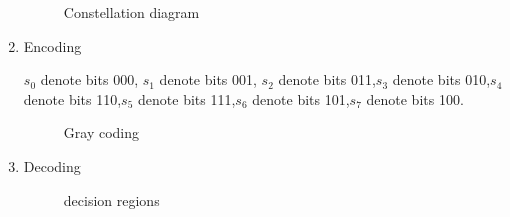 \begin{enumerate}[label=\thesubsection.\arabic*.,ref=\thesubsection.\theenumi]
\begin{figure}[!ht]
                \resizebox{\columnwidth}{!}{}
\label{fig:ee18btech11012_fig1}
\caption{Constellation diagram}
\end{figure}


\item Encoding

$s_0$ denote bits 000, $s_1$ denote bits 001, $s_2$ denote bits 011,$s_3$ denote bits 010,$s_4$ denote bits 110,$s_5$ denote bits 111,$s_6$ denote bits 101,$s_7$ denote bits 100.
\begin{figure}[!ht]
                \resizebox{\columnwidth}{!}{}
\label{fig:ee18btech11012_fig2}
\caption{Gray coding}
\end{figure}
\begin{figure}[!ht]
                \resizebox{\columnwidth}{!}{}
\label{fig:ee18btech11012_fig5}
\caption{}
\end{figure}

\item Decoding



\begin{figure}[!ht]

                \resizebox{\columnwidth}{!}{}

\label{fig:ee18btech11012_fig3}
\caption{decision regions}
	
\end{figure}


\end{enumerate}
